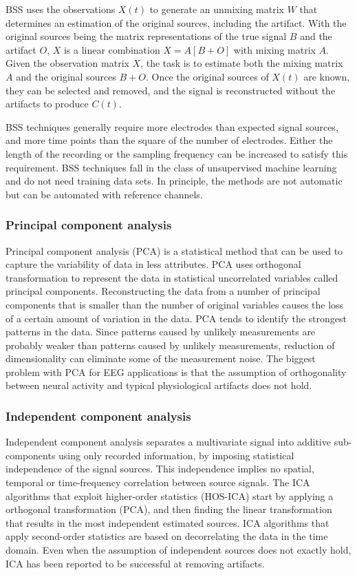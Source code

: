 \documentclass[twoside]{article}
\begin{document}
BSS uses the observations $X(t)$ to generate an unmixing matrix $W$ that determines an estimation of the original sources, including the artifact. With the original sources being the matrix representations of the true signal $B$ and the artifact $O$, $X$ is a linear combination $X = A\left[B+O\right]$ with mixing matrix $A$. Given the observation matrix $X$, the task is to estimate both the mixing matrix $A$ and the original sources $B+O$. Once the original sources of $X(t)$ are known, they can be selected and removed, and the signal is reconstructed without the artifacts to produce $C(t)$. 

BSS techniques generally require more electrodes than expected signal sources, and more time points than the square of the number of electrodes. Either the length of the recording or the sampling frequency can be increased to satisfy this requirement. BSS techniques fall in the class of unsupervised machine learning and do not need training data sets. In principle, the methods are not automatic but can be automated with reference channels. 


\subsubsection{Principal component analysis \cite{eegguidelines} \cite{tandm}}
Principal component analysis (PCA) is a statistical method that can be used to capture the variability of data in less attributes. PCA uses orthogonal transformation to represent the data in statistical uncorrelated variables called principal components. Reconstructing the data from a number of principal components that is smaller than the number of original variables causes the loss of a certain amount of variation in the data. PCA tends to identify the strongest patterns in the data. Since patterns caused by unlikely measurements are probably weaker than patterns caused by unlikely measurements, reduction of dimensionality can eliminate some of the measurement noise. The biggest problem with PCA for EEG applications is that the assumption of orthogonality between neural activity and typical physiological artifacts does not hold. 


\subsubsection{Independent component analysis \cite{eegguidelines} \cite{automatedica}}
Independent component analysis separates a multivariate signal into additive sub-components using only recorded information, by imposing statistical independence of the signal sources. This independence implies no spatial, temporal or time-frequency correlation between source signals. The ICA algorithms that exploit higher-order statistics (HOS-ICA) start by applying a orthogonal transformation (PCA), and then finding the linear transformation that results in the most independent estimated sources. ICA algorithms that apply second-order statistics are based on decorrelating the data in the time domain. Even when the assumption of independent sources does not exactly hold, ICA has been reported to be successful at removing artifacts. 
\end{document}
